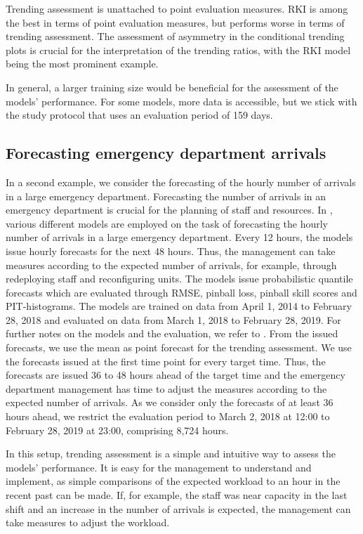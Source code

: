 Trending assessment is unattached to point evaluation measures.
RKI is among the best in terms of point evaluation measures, but performs worse in terms of trending assessment.
The assessment of asymmetry in the conditional trending plots is crucial for the interpretation of the trending ratios, with the RKI model being the most prominent example.

In general, a larger training size would be beneficial for the assessment of the models' performance.
For some models, more data is accessible, but we stick with the study protocol that uses an evaluation period of 159 days.

\newpage
\subsection{Forecasting emergency department arrivals}\label{sec:application-eda}

In a second example, we consider the forecasting of the hourly number of arrivals in a large emergency department.
Forecasting the number of arrivals in an emergency department is crucial for the planning of staff and resources.
In \textcite{Rostami-Tabar2023}, various different models are employed on the task of forecasting the hourly number of arrivals in a large emergency department.
Every 12 hours, the models issue hourly forecasts for the next 48 hours.
Thus, the management can take measures according to the expected number of arrivals, for example, through redeploying staff and reconfiguring units.
The models issue probabilistic quantile forecasts which are evaluated through RMSE, pinball loss, pinball skill scores and PIT-histograms.
The models are trained on data from April 1, 2014 to February 28, 2018 and evaluated on data from March 1, 2018 to February 28, 2019.
For further notes on the models and the evaluation, we refer to \textcite{Rostami-Tabar2023}.
From the issued forecasts, we use the mean as point forecast for the trending assessment.
We use the forecasts issued at the first time point for every target time.
Thus, the forecasts are issued 36 to 48 hours ahead of the target time and the emergency department management has time to adjust the measures according to the expected number of arrivals.
As we consider only the forecasts of at least 36 hours ahead, we restrict the evaluation period to March 2, 2018 at 12:00 to February 28, 2019 at 23:00, comprising 8,724 hours.

In this setup, trending assessment is a simple and intuitive way to assess the models' performance.
It is easy for the management to understand and implement, as simple comparisons of the expected workload to an hour in the recent past can be made.
If, for example, the staff was near capacity in the last shift and an increase in the number of arrivals is expected, the management can take measures to adjust the workload.

